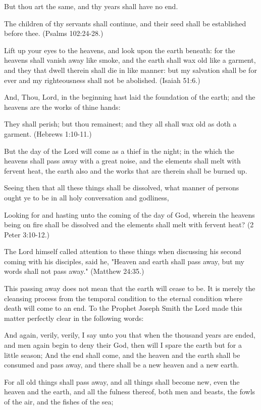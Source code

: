But thou art the same, and thy years shall have no end.
 
The children of thy servants shall continue, and their seed shall be established before thee.
(Psalms 102:24-28.)

Lift up your eyes to the heavens, and look upon the earth beneath: for the heavens shall
vanish away like smoke, and the earth shall wax old like a garment, and they that dwell
therein shall die in like manner: but my salvation shall be for ever and my righteousness shall
not be abolished. (Isaiah 51:6.)

And, Thou, Lord, in the beginning hast laid the foundation of the earth; and the heavens are
the works of thine hands:

They shall perish; but thou remainest; and they all shall wax old as doth a garment. (Hebrews
1:10-11.)

But the day of the Lord will come as a thief in the night; in the which the heavens shall pass
away with a great noise, and the elements shall melt with fervent heat, the earth also and the
works that are therein shall be burned up.

Seeing then that all these things shall be dissolved, what manner of persons ought ye to be in
all holy conversation and godliness,

Looking for and hasting unto the coming of the day of God, wherein the heavens being on
fire shall be dissolved and the elements shall melt with fervent heat? (2 Peter 3:10-12.)

The Lord himself called attention to these things when discussing his second coming with his
disciples, said he, "Heaven and earth shall pass away, but my words shall not pass away."
(Matthew 24:35.)

This passing away does not mean that the earth will cease to be. It is merely the cleansing
process from the temporal condition to the eternal condition where death will come to an end.
To the Prophet Joseph Smith the Lord made this matter perfectly clear in the following
words:

And again, verily, verily, I say unto you that when the thousand years are ended, and men
again begin to deny their God, then will I spare the earth but for a little season;
And the end shall come, and the heaven and the earth shall be consumed and pass away, and
there shall be a new heaven and a new earth.

For all old things shall pass away, and all things shall become new, even the heaven and the
earth, and all the fulness thereof, both men and beasts, the fowls of the air, and the fishes of
the sea;

